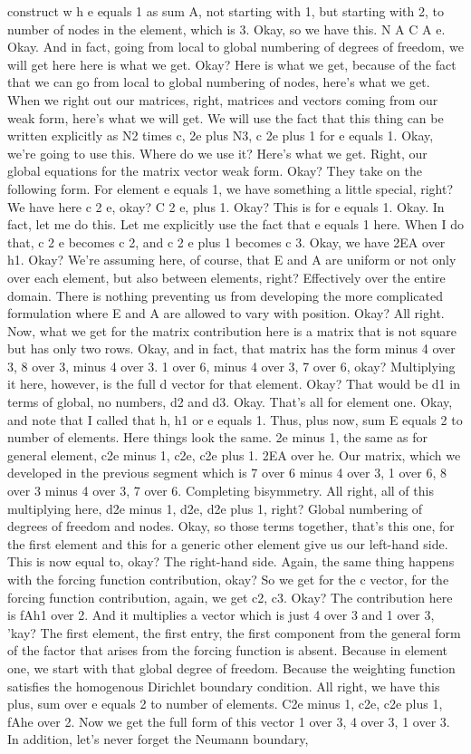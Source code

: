 \documentclass[10pt]{article}
\begin{document}
{construct w h e equals 1 as sum A, not starting with 1, but starting with 2, to number of nodes in the element, which is 3. Okay, so we have this. N A C A e. Okay. And in fact, going from local to global numbering of degrees of freedom, we will get here here is what we get. Okay? Here is what we get, because of the fact that we can go from local to global numbering of nodes, here's what we get. When we right out our matrices, right, matrices and vectors coming from our weak form, here's what we will get. We will use the fact that this thing can be written explicitly as N2 times c, 2e plus N3, c 2e plus 1 for e equals 1. Okay, we're going to use this. Where do we use it? Here's what we get. Right, our global equations for the matrix vector weak form. Okay? They take on the following form. For element e equals 1, we have something a little special, right? We have here c 2 e, okay? C 2 e, plus 1. Okay? This is for e equals 1. Okay. In fact, let me do this. Let me explicitly use the fact that e equals 1 here. When I do that, c 2 e becomes c 2, and c 2 e plus 1 becomes c 3. Okay, we have 2EA over h1. Okay? We're assuming here, of course, that E and A are uniform or not only over each element, but also between elements, right? Effectively over the entire domain. There is nothing preventing us from developing the more complicated formulation where E and A are allowed to vary with position. Okay? All right. Now, what we get for the matrix contribution here is a matrix that is not square but has only two rows. Okay, and in fact, that matrix has the form minus 4 over 3, 8 over 3, minus 4 over 3. 1 over 6, minus 4 over 3, 7 over 6, okay? Multiplying it here, however, is the full d vector for that element. Okay? That would be d1 in terms of global, no numbers, d2 and d3. Okay. That's all for element one. Okay, and note that I called that h, h1 or e equals 1. Thus, plus now, sum E equals 2 to number of elements. Here things look the same. 2e minus 1, the same as for general element, c2e minus 1, c2e, c2e plus 1. 2EA over he. Our matrix, which we developed in the previous segment which is 7 over 6 minus 4 over 3, 1 over 6, 8 over 3 minus 4 over 3, 7 over 6. Completing bisymmetry. All right, all of this multiplying here, d2e minus 1, d2e, d2e plus 1, right? Global numbering of degrees of freedom and nodes. Okay, so those terms together, that's this one, for the first element and this for a generic other element give us our left-hand side. This is now equal to, okay? The right-hand side. Again, the same thing happens with the forcing function contribution, okay? So we get for the c vector, for the forcing function contribution, again, we get c2, c3. Okay? The contribution here is fAh1 over 2. And it multiplies a vector which is just 4 over 3 and 1 over 3, 'kay? The first element, the first entry, the first component from the general form of the factor that arises from the forcing function is absent. Because in element one, we start with that global degree of freedom. Because the weighting function satisfies the homogenous Dirichlet boundary condition. All right, we have this plus, sum over e equals 2 to number of elements. C2e minus 1, c2e, c2e plus 1, fAhe over 2. Now we get the full form of this vector 1 over 3, 4 over 3, 1 over 3. In addition, let's never forget the Neumann boundary, }
\end{document}
